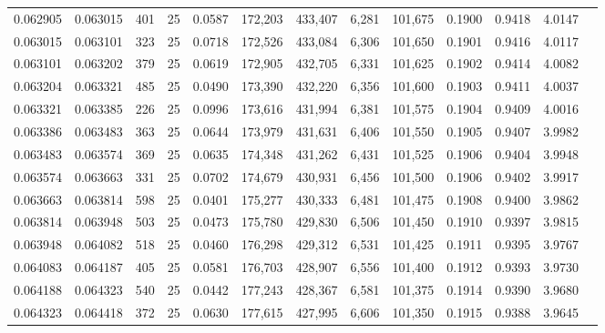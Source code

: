 \begin{tabular}{rrrrrrrrrrrrr}
0.062905 & 0.063015 &   401 &  25 &                                     0.0587 & 172,203 & 433,407 &   6,281 & 101,675 & 0.1900 & 0.9418 & 4.0147 \\
0.063015 & 0.063101 &   323 &  25 &                                     0.0718 & 172,526 & 433,084 &   6,306 & 101,650 & 0.1901 & 0.9416 & 4.0117 \\
0.063101 & 0.063202 &   379 &  25 &                                     0.0619 & 172,905 & 432,705 &   6,331 & 101,625 & 0.1902 & 0.9414 & 4.0082 \\
0.063204 & 0.063321 &   485 &  25 &                                     0.0490 & 173,390 & 432,220 &   6,356 & 101,600 & 0.1903 & 0.9411 & 4.0037 \\
0.063321 & 0.063385 &   226 &  25 &                                     0.0996 & 173,616 & 431,994 &   6,381 & 101,575 & 0.1904 & 0.9409 & 4.0016 \\
0.063386 & 0.063483 &   363 &  25 &                                     0.0644 & 173,979 & 431,631 &   6,406 & 101,550 & 0.1905 & 0.9407 & 3.9982 \\
0.063483 & 0.063574 &   369 &  25 &                                     0.0635 & 174,348 & 431,262 &   6,431 & 101,525 & 0.1906 & 0.9404 & 3.9948 \\
0.063574 & 0.063663 &   331 &  25 &                                     0.0702 & 174,679 & 430,931 &   6,456 & 101,500 & 0.1906 & 0.9402 & 3.9917 \\
0.063663 & 0.063814 &   598 &  25 &                                     0.0401 & 175,277 & 430,333 &   6,481 & 101,475 & 0.1908 & 0.9400 & 3.9862 \\
0.063814 & 0.063948 &   503 &  25 &                                     0.0473 & 175,780 & 429,830 &   6,506 & 101,450 & 0.1910 & 0.9397 & 3.9815 \\
0.063948 & 0.064082 &   518 &  25 &                                     0.0460 & 176,298 & 429,312 &   6,531 & 101,425 & 0.1911 & 0.9395 & 3.9767 \\
0.064083 & 0.064187 &   405 &  25 &                                     0.0581 & 176,703 & 428,907 &   6,556 & 101,400 & 0.1912 & 0.9393 & 3.9730 \\
0.064188 & 0.064323 &   540 &  25 &                                     0.0442 & 177,243 & 428,367 &   6,581 & 101,375 & 0.1914 & 0.9390 & 3.9680 \\
0.064323 & 0.064418 &   372 &  25 &                                     0.0630 & 177,615 & 427,995 &   6,606 & 101,350 & 0.1915 & 0.9388 & 3.9645 \\

\end{tabular}
